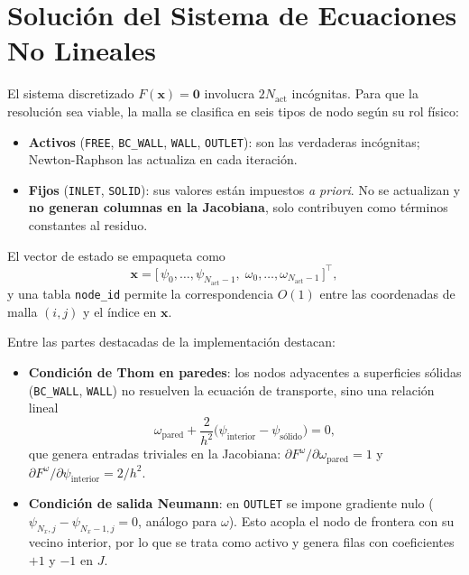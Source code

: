 \documentclass[12pt, a4paper]{article}
\begin{document}
\section{Solución del Sistema de Ecuaciones No Lineales}

El sistema discretizado \(F(\mathbf{x}) = \mathbf{0}\) involucra \(2N_{\text{act}}\) incógnitas. Para que la resolución sea viable, la malla se clasifica en seis tipos de nodo según su rol físico:

\begin{itemize}
    \item \textbf{Activos} (\texttt{FREE}, \texttt{BC\_WALL}, \texttt{WALL}, \texttt{OUTLET}): son las verdaderas incógnitas; Newton-Raphson las actualiza en cada iteración.
    \item \textbf{Fijos} (\texttt{INLET}, \texttt{SOLID}): sus valores están impuestos \emph{a priori}. No se actualizan y \textbf{no generan columnas en la Jacobiana}, solo contribuyen como términos constantes al residuo.
\end{itemize}

El vector de estado se empaqueta como
\[
\mathbf{x} = \bigl[\,\psi_0,\dots,\psi_{N_{\text{act}}-1},\;
                \omega_0,\dots,\omega_{N_{\text{act}}-1}\,\bigr]^{\!\top},
\]
y una tabla \texttt{node\_id} permite la correspondencia \(O(1)\) entre las coordenadas de malla \((i,j)\) y el índice en \(\mathbf{x}\).

Entre las partes destacadas de la implementación destacan:

\begin{itemize}
    \item \textbf{Condición de Thom en paredes}: los nodos adyacentes a superficies sólidas (\texttt{BC\_WALL}, \texttt{WALL}) no resuelven la ecuación de transporte, sino una relación lineal
    \[
    \omega_{\text{pared}} + \frac{2}{h^{2}}\bigl(\psi_{\text{interior}} - \psi_{\text{sólido}}\bigr) = 0,
    \]
    que genera entradas triviales en la Jacobiana: \(\partial F^\omega/\partial\omega_{\text{pared}} = 1\) y \(\partial F^\omega/\partial\psi_{\text{interior}} = 2/h^{2}\).

    \item \textbf{Condición de salida Neumann}: en \texttt{OUTLET} se impone gradiente nulo (\(\psi_{N_x,j} - \psi_{N_x-1,j}=0\), análogo para \(\omega\)). Esto acopla el nodo de frontera con su vecino interior, por lo que se trata como activo y genera filas con coeficientes \(+1\) y \(-1\) en \(J\).
\end{itemize}
\end{document}
